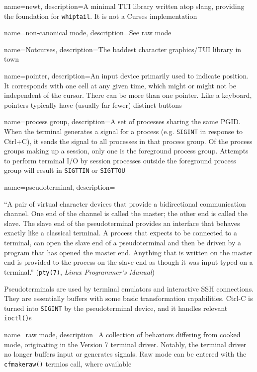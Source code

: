{
  name={newt},
description={A minimal TUI library written atop slang, providing the foundation
  for \texttt{whiptail}. It is not a Curses implementation}
}

{
  name={non-canonical mode},
description={See \gls{raw mode}}
}

{
  name={Notcurses},
description={The baddest character graphics/TUI library in town}
}

{
  name={pointer},
description={An input device primarily used to indicate position. It
  corresponds with one cell at any given time, which might or might not be
  independent of the cursor. There can be more than one pointer. Like a
  keyboard, pointers typically have (usually far fewer) distinct buttons}
}

{
  name={process group},
description={A set of processes sharing the same PGID. When the terminal
  generates a signal for a process (e.g. \texttt{SIGINT} in response to Ctrl+C), it
  sends the signal to all processes in that process group. Of the process
  groups making up a session, only one is the foreground process group.
  Attempts to perform terminal I/O by session processes outside the foreground
  process group will result in \texttt{SIGTTIN} or \texttt{SIGTTOU}}
}

{
  name={pseudoterminal},
description={``A pair of virtual character devices that provide a
  bidirectional communication channel. One end of the channel is called the
  master; the other end is called the slave. The slave end of the
  pseudoterminal provides an interface that behaves exactly like a classical
  terminal. A process that expects to be connected to a terminal, can open
  the slave end of a pseudoterminal and then be driven by a program that has
  opened the master end. Anything that is written on the master end is
  provided to the process on the slave end as though it was input typed on a
  terminal.'' (\texttt{pty(7)}, \textit{Linux Programmer's Manual})

 Pseudoterminals are used by terminal emulators and interactive SSH
  connections. They are essentially buffers with some basic transformation
  capabilities. Ctrl-C is turned into \texttt{SIGINT} by the pseudoterminal device,
  and it handles relevant \texttt{ioctl()}s}
}

{
  name={raw mode},
  description={A collection of behaviors differing from \gls{cooked mode},
   originating in the Version 7 terminal driver. Notably, the terminal driver no
   longer buffers input or generates signals. Raw mode can be entered with the
   \texttt{cfmakeraw()} termios call, where available}
}

